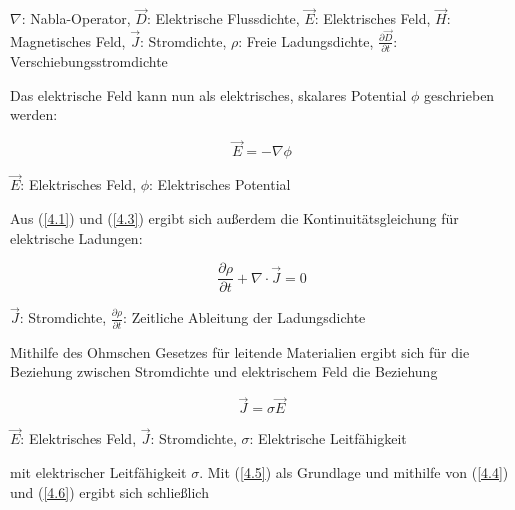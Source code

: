 \documentclass[12pt, a4paper]{article}
\renewcommand{\footnotesize}{\fontsize{10pt}{12pt}\selectfont}
\begin{document}
\vspace{-0.8em}
\begin{center}
	\footnotesize
	$\nabla$: Nabla-Operator, $\vec{D}$: Elektrische Flussdichte, $\vec{E}$: Elektrisches Feld, $\vec{H}$: Magnetisches Feld, $\vec{J}$: Stromdichte, $\rho$: Freie Ladungsdichte, $\frac{\partial\vec{D}}{\partial{t}}$: Verschiebungsstromdichte
\end{center}
\raggedright

Das elektrische Feld kann nun als elektrisches, skalares Potential $\phi$ geschrieben werden:

\begin{equation}
	\vec{E}=-\nabla\phi
	\tag{4.4}
	\label{4.4}
\end{equation}

\vspace{-0.8em}
\begin{center}
	\footnotesize
	$\vec{E}$: Elektrisches Feld, $\phi$: Elektrisches Potential
\end{center}
\raggedright

Aus (\ref{4.1}) und (\ref{4.3}) ergibt sich außerdem die Kontinuitätsgleichung für elektrische Ladungen:

\begin{equation}
	\frac{\partial\rho}{\partial{t}}+\nabla\cdot\vec{J}=0
	\tag{4.5}
	\label{4.5}
\end{equation}

\vspace{-0.8em}
\begin{center}
	\footnotesize
	$\vec{J}$: Stromdichte, $\frac{\partial\rho}{\partial{t}}$: Zeitliche Ableitung der Ladungsdichte
\end{center}
\raggedright	

Mithilfe des Ohmschen Gesetzes für leitende Materialien ergibt sich für die Beziehung zwischen Stromdichte und elektrischem Feld die Beziehung

\begin{equation}
	\vec{J}=\sigma\vec{E}
	\tag{4.6}
	\label{4.6}
\end{equation}

\vspace{-0.8em}
\begin{center}
	\footnotesize
	$\vec{E}$: Elektrisches Feld, $\vec{J}$: Stromdichte, $\sigma$: Elektrische Leitfähigkeit
\end{center}
\raggedright

mit elektrischer Leitfähigkeit $\sigma$. Mit (\ref{4.5}) als Grundlage und mithilfe von (\ref{4.4}) und (\ref{4.6}) ergibt sich schließlich
\end{document}
